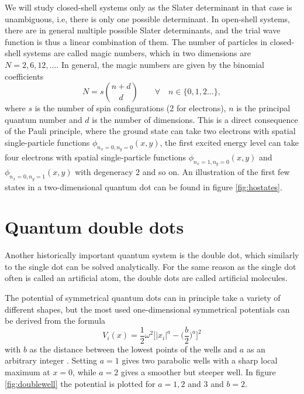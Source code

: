 We will study closed-shell systems only as the Slater determinant in that case is unambiguous, i.e, there is only one possible determinant. In open-shell systems, there are in general multiple possible Slater determinants, and the trial wave function is thus a linear combination of them. The number of particles in closed-shell systems are called magic numbers, which in two dimensions are $N=2,6,12,\hdots$. In general, the magic numbers are given by the binomial coefficients
\begin{equation}
N=s\binom{n+d}{d} \quad\quad\forall\quad n\in\{0,1,2...\},
\label{eq:HOclosedshell}
\end{equation}
where $s$ is the number of spin configurations (2 for electrons), $n$ is the principal quantum number and $d$ is the number of dimensions. This is a direct consequence of the Pauli principle, where the ground state can take two electrons with spatial single-particle functions $\phi_{n_x=0,n_y=0}(x,y)$, the first excited energy level can take four electrons with spatial single-particle functions $\phi_{n_x=1,n_y=0}(x,y)$ and $\phi_{n_x=0,n_y=1}(x,y)$ with degeneracy 2 and so on. An illustration of the first few states in a two-dimensional quantum dot can be found in figure \eqref{fig:hostates}.


%

\section{Quantum double dots} \label{sec:doubledots}
Another historically important quantum system is the double dot, which similarly to the single dot can be solved analytically. For the same reason as the single dot often is called an artificial atom, the double dots are called artificial molecules. 

The potential of symmetrical quantum dots can in principle take a variety of different shapes, but the most used one-dimensional symmetrical potentials can be derived from the formula
\begin{equation}
V_i(x)=\frac{1}{2}\omega^2\bigg[|x_i|^a-\Big(\frac{b}{2}\Big)^a\bigg]^2
\label{eq:doublewell}
\end{equation}
with $b$ as the distance between the lowest points of the wells and $a$ as an arbitrary integer \supercite{jelic_double_2012}. Setting $a=1$ gives two parabolic wells with a sharp local maximum at $x=0$, while $a=2$ gives a smoother but steeper well. In figure \eqref{fig:doublewell} the potential is plotted for $a=1,2$ and $3$ and $b=2$.

